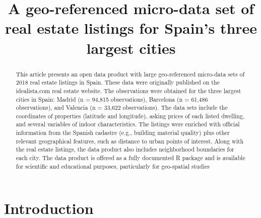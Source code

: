 \documentclass[Royal,times,sageh]{sagej}
\begin{document}

\title{A geo-referenced micro-data set of real estate listings for
Spain's three largest cities}


\author{\affilnum{}}

\affiliation{}



\begin{abstract}
This article presents an open data product with large geo-referenced
micro-data sets of 2018 real estate listings in Spain. These data were
originally published on the idealista.com real estate website. The
observations were obtained for the three largest cities in Spain: Madrid
(n = 94,815 observations), Barcelona (n = 61,486 observations), and
Valencia (n = 33,622 observations). The data sets include the
coordinates of properties (latitude and longitude), asking prices of
each listed dwelling, and several variables of indoor characteristics.
The listings were enriched with official information from the Spanish
cadastre (e.g., building material quality) plus other relevant
geographical features, such as distance to urban points of interest.
Along with the real estate listings, the data product also includes
neighborhood boundaries for each city. The data product is offered as a
fully documented R package and is available for scientific and
educational purposes, particularly for geo-spatial studies
\end{abstract}


\maketitle

\hypertarget{introduction}{%
\section{Introduction}\label{introduction}}
\end{document}
